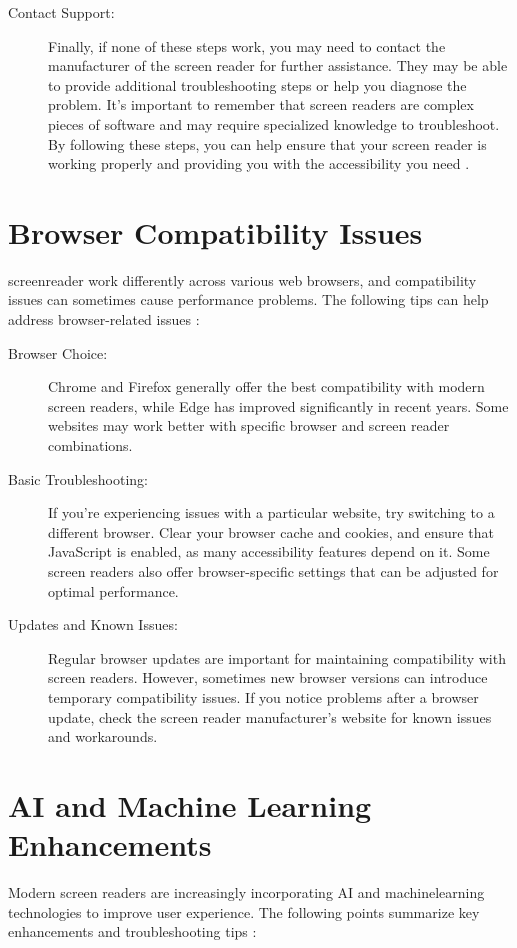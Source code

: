 \begin{description}
	\item[Contact Support:] Finally, if none of these steps work, you may need to contact the manufacturer of the screen reader for further assistance. They may be able to provide additional troubleshooting steps or help you diagnose the problem. It's important to remember that screen readers are complex pieces of software and may require specialized knowledge to troubleshoot. By following these steps, you can help ensure that your screen reader is working properly and providing you with the accessibility you need \cite{FreedomScientificJAWS, NVAccess, MicrosoftAccessibility}.
\end{description}

\section{Browser Compatibility Issues}
\label{app1:browser}
\gls{screenreader} work differently across various web browsers, and compatibility issues can sometimes cause performance problems. The following tips can help address browser-related issues \cite{WebAIMSurvey}:

\begin{description}
	\item[Browser Choice:] Chrome and Firefox generally offer the best compatibility with modern screen readers, while Edge has improved significantly in recent years. Some websites may work better with specific browser and screen reader combinations.
	\item[Basic Troubleshooting:] If you're experiencing issues with a particular website, try switching to a different browser. Clear your browser cache and cookies, and ensure that JavaScript is enabled, as many accessibility features depend on it. Some screen readers also offer browser-specific settings that can be adjusted for optimal performance.
	\item[Updates and Known Issues:] Regular browser updates are important for maintaining compatibility with screen readers. However, sometimes new browser versions can introduce temporary compatibility issues. If you notice problems after a browser update, check the screen reader manufacturer's website for known issues and workarounds.
\end{description}

\section{AI and Machine Learning Enhancements}
\label{app1:ai}
Modern screen readers are increasingly incorporating \gls{AI} and \gls{machinelearning} technologies to improve user experience. The following points summarize key enhancements and \gls{troubleshooting} tips \cite{MicrosoftAIAccessibility, Kim2023}:

